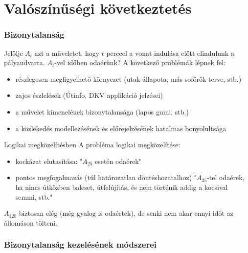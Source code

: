 \section{Valószínűségi következtetés}

\subsubsection{Bizonytalanság}

Jelölje $A_t$ azt a műveletet, hogy $t$ perccel a vonat indulása előtt
elindulunk a pályaudvarra. $A_t$-vel időben odaérünk? A következő
problémák lépnek fel:
\begin{itemize}
    \item részlegesen megfigyelhető környezet (utak állapota, más sofőrök
        terve, stb.)
    \item zajos észlelések (Útinfo, DKV applikáció jelzései)
    \item a művelet kimenelének bizonytalansága (lapos gumi, stb.)
    \item a közlekedés modellezésének és előrejelzésének hatalmas bonyolultsága
\end{itemize}

Logikai megközelítésben
A probléma logikai megközelítése:
\begin{itemize}
    \item kockázat elutasítása: "$A_{25}$ esetén odaérek"
    \item pontos megfogalmazás (túl határozatlan döntéshozatalhoz) "$A_{25}$-tel
        odaérek, ha nincs útközben baleset, útfelújítás, és nem történik addig
        a kocsival semmi, stb."
\end{itemize}

$A_{120}$ biztosan elég (még gyalog is odaértek), de senki nem akar ennyi időt
az állomáson tölteni.

\subsubsection{Bizonytalanság kezelésének módszerei}

